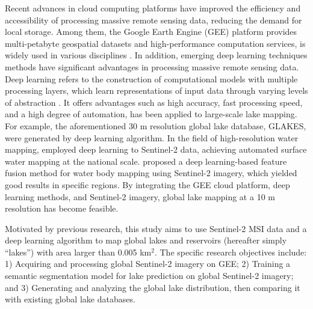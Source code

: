 \documentclass[preprint,12pt,authoryear]{elsarticle}
\begin{document}
Recent advances in cloud computing platforms have improved the efficiency and accessibility of processing massive remote sensing data, reducing the demand for local storage. Among them, the Google Earth Engine (GEE) platform provides multi-petabyte geospatial datasets and high-performance computation services, is widely used in various disciplines \citep{gorelick_google_2017}. In addition, emerging deep learning techniques methods have significant advantages in processing massive remote sensing data. Deep learning refers to the construction of computational models with multiple processing layers, which learn representations of input data through varying levels of abstraction \citep{lecun_deep_2015}. It offers advantages such as high accuracy, fast processing speed, and a high degree of automation, has been applied to large-scale lake mapping. For example, the aforementioned 30 m resolution global lake database, GLAKES, were generated by deep learning algorithm. In the field of high-resolution water mapping, \citet{li_automatic_2021} employed deep learning to Sentinel-2 data, achieving automated surface water mapping at the national scale. \citet{manocha_mapping_2023} proposed a deep learning-based feature fusion method for water body mapping using Sentinel-2 imagery, which yielded good results in specific regions. By integrating the GEE cloud platform, deep learning methods, and Sentinel-2 imagery, global lake mapping at a 10 m resolution has become feasible.

Motivated by previous research, this study aims to use Sentinel-2 MSI data and a deep learning algorithm to map global lakes and reservoirs (hereafter simply “lakes”) with area larger than 0.005 km$^2$. The specific research objectives include: 1) Acquiring and processing global Sentinel-2 imagery on GEE; 2) Training a semantic segmentation model for lake prediction on global Sentinel-2 imagery; and 3) Generating and analyzing the global lake distribution, then comparing it with existing global lake databases.
\end{document}
